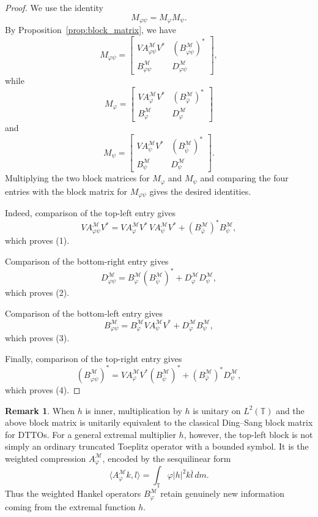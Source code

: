 \documentclass[12pt]{amsart}
\theoremstyle{definition}
\newtheorem{remark}[theorem]{Remark}
\theoremstyle{remark}
\def \T{\mathbb{T}}
\newcommand{\clm}{\mathcal{M}}
\newcommand{\vp}{\varphi}
\numberwithin{equation}{section}
\begin{document}
\begin{proof}
We use the identity
\[
M_{\vp\psi}=M_\vp M_\psi.
\]
By Proposition~\ref{prop:block_matrix}, we have
\[
M_{\vp\psi}
=
\begin{bmatrix}
V A_{\vp\psi}^\clm V^* & (B_{\overline{\vp\psi}}^\clm)^*\\
B_{\vp\psi}^\clm & D_{\vp\psi}^\clm
\end{bmatrix},
\]
while
\[
M_\vp
=
\begin{bmatrix}
V A_\vp^\clm V^* & (B_{\bar\vp}^\clm)^*\\
B_\vp^\clm & D_\vp^\clm
\end{bmatrix}
\]
and
\[
M_\psi
=
\begin{bmatrix}
V A_\psi^\clm V^* & (B_{\bar\psi}^\clm)^*\\
B_\psi^\clm & D_\psi^\clm
\end{bmatrix}.
\]
Multiplying the two block matrices for $M_\vp$ and $M_\psi$ and comparing
the four entries with the block matrix for $M_{\vp\psi}$ gives the desired
identities.

Indeed, comparison of the top-left entry gives
\[
V A_{\vp\psi}^\clm V^*
=
V A_\vp^\clm V^*\,V A_\psi^\clm V^*
+
(B_{\bar\vp}^\clm)^*B_\psi^\clm,
\]
which proves (1).

Comparison of the bottom-right entry gives
\[
D_{\vp\psi}^\clm
=
B_\vp^\clm(B_{\bar\psi}^\clm)^*
+
D_\vp^\clm D_\psi^\clm,
\]
which proves (2).

Comparison of the bottom-left entry gives
\[
B_{\vp\psi}^\clm
=
B_\vp^\clm V A_\psi^\clm V^*
+
D_\vp^\clm B_\psi^\clm,
\]
which proves (3).

Finally, comparison of the top-right entry gives
\[
(B_{\overline{\vp\psi}}^\clm)^*
=
V A_\vp^\clm V^*(B_{\bar\psi}^\clm)^*
+
(B_{\bar\vp}^\clm)^*D_\psi^\clm,
\]
which proves (4).
\end{proof}





\begin{remark}
When $h$ is inner, multiplication by $h$ is unitary on $L^2(\T)$ and the
above block matrix is unitarily equivalent to the classical Ding--Sang
block matrix for DTTOs. For a general extremal multiplier $h$, however,
the top-left block is not simply an ordinary truncated Toeplitz operator
with a bounded symbol. It is the weighted compression $A_\vp^\clm$,
encoded by the sesquilinear form
\[
\langle A_\vp^\clm k,l\rangle
=
\int_\T \vp |h|^2 k\bar l\,dm.
\]
Thus the weighted Hankel operators $B_\vp^\clm$ retain genuinely new
information coming from the extremal function $h$.
\end{remark}
\end{document}
